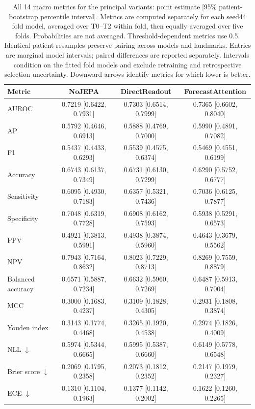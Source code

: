 \begin{table}[t]
\centering
\footnotesize
\setlength{\tabcolsep}{5pt}
\caption{All 14 macro metrics for the principal variants: point estimate [95\% patient-bootstrap percentile interval]. Metrics are computed separately for each seed44 fold model, averaged over T0--T2 within fold, then equally averaged over five folds. Probabilities are not averaged. Threshold-dependent metrics use 0.5. Identical patient resamples preserve pairing across models and landmarks. Entries are marginal model intervals; paired differences are reported separately. Intervals condition on the fitted fold models and exclude retraining and retrospective selection uncertainty. Downward arrows identify metrics for which lower is better.}
\label{tab:extended_macro}
\begin{tabular}{lccc}
\toprule
Metric & NoJEPA & DirectReadout & ForecastAttention \\
\midrule
AUROC & 0.7219 [0.6422, 0.7931] & 0.7303 [0.6514, 0.7999] & 0.7365 [0.6602, 0.8040] \\
AP & 0.5792 [0.4646, 0.6913] & 0.5888 [0.4769, 0.7000] & 0.5990 [0.4891, 0.7082] \\
F1 & 0.5437 [0.4433, 0.6293] & 0.5539 [0.4575, 0.6374] & 0.5469 [0.4551, 0.6199] \\
Accuracy & 0.6743 [0.6137, 0.7349] & 0.6731 [0.6130, 0.7299] & 0.6290 [0.5752, 0.6777] \\
Sensitivity & 0.6095 [0.4930, 0.7183] & 0.6357 [0.5321, 0.7436] & 0.7036 [0.6125, 0.7877] \\
Specificity & 0.7048 [0.6319, 0.7728] & 0.6908 [0.6162, 0.7593] & 0.5938 [0.5291, 0.6573] \\
PPV & 0.4921 [0.3813, 0.5991] & 0.4938 [0.3874, 0.5960] & 0.4643 [0.3679, 0.5562] \\
NPV & 0.7943 [0.7164, 0.8632] & 0.8023 [0.7229, 0.8713] & 0.8269 [0.7559, 0.8879] \\
Balanced accuracy & 0.6571 [0.5887, 0.7234] & 0.6632 [0.5960, 0.7269] & 0.6487 [0.5913, 0.7004] \\
MCC & 0.3000 [0.1683, 0.4237] & 0.3109 [0.1828, 0.4305] & 0.2931 [0.1808, 0.3874] \\
Youden index & 0.3143 [0.1774, 0.4468] & 0.3265 [0.1920, 0.4538] & 0.2974 [0.1826, 0.4009] \\
NLL $\downarrow$ & 0.5974 [0.5344, 0.6665] & 0.5995 [0.5387, 0.6660] & 0.6149 [0.5778, 0.6548] \\
Brier score $\downarrow$ & 0.2069 [0.1795, 0.2358] & 0.2073 [0.1812, 0.2352] & 0.2147 [0.1979, 0.2327] \\
ECE $\downarrow$ & 0.1310 [0.1104, 0.1963] & 0.1377 [0.1142, 0.2002] & 0.1622 [0.1260, 0.2265] \\
\bottomrule
\end{tabular}
\end{table}
